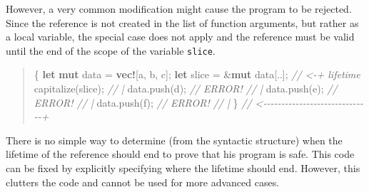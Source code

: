 \documentclass[
  11pt,
  twoside,symmetric]{report}
\newenvironment{Shaded}{}{}
\newcommand{\CharTok}[1]{#1}
\newcommand{\CommentTok}[1]{\textit{#1}}
\newcommand{\KeywordTok}[1]{\textbf{#1}}
\newcommand{\NormalTok}[1]{#1}
\newcommand{\OperatorTok}[1]{#1}
\newcommand{\PreprocessorTok}[1]{\textbf{#1}}
\begin{document}
However, a very common modification might cause the program to be
rejected. Since the reference is not created in the list of function
arguments, but rather as a local variable, the special case does not
apply and the reference must be valid until the end of the scope of the
variable \texttt{slice}.

\begin{quote}
\begin{Shaded}
\begin{Highlighting}[]
\OperatorTok{\{}
    \KeywordTok{let} \KeywordTok{mut}\NormalTok{ data }\OperatorTok{=} \PreprocessorTok{vec!}\NormalTok{[}\CharTok{\textquotesingle{}a\textquotesingle{}}\OperatorTok{,} \CharTok{\textquotesingle{}b\textquotesingle{}}\OperatorTok{,} \CharTok{\textquotesingle{}c\textquotesingle{}}\NormalTok{]}\OperatorTok{;}
    \KeywordTok{let}\NormalTok{ slice }\OperatorTok{=} \OperatorTok{\&}\KeywordTok{mut}\NormalTok{ data[}\OperatorTok{..}\NormalTok{]}\OperatorTok{;} \CommentTok{// \textless{}{-}+ \textquotesingle{}lifetime}
\NormalTok{    capitalize(slice)}\OperatorTok{;}         \CommentTok{//   |}
\NormalTok{    data}\OperatorTok{.}\NormalTok{push(}\CharTok{\textquotesingle{}d\textquotesingle{}}\NormalTok{)}\OperatorTok{;} \CommentTok{// ERROR!  //   |}
\NormalTok{    data}\OperatorTok{.}\NormalTok{push(}\CharTok{\textquotesingle{}e\textquotesingle{}}\NormalTok{)}\OperatorTok{;} \CommentTok{// ERROR!  //   |}
\NormalTok{    data}\OperatorTok{.}\NormalTok{push(}\CharTok{\textquotesingle{}f\textquotesingle{}}\NormalTok{)}\OperatorTok{;} \CommentTok{// ERROR!  //   |}
\OperatorTok{\}} \CommentTok{// \textless{}{-}{-}{-}{-}{-}{-}{-}{-}{-}{-}{-}{-}{-}{-}{-}{-}{-}{-}{-}{-}{-}{-}{-}{-}{-}{-}{-}{-}{-}{-}+}
\end{Highlighting}
\end{Shaded}
\end{quote}

There is no simple way to determine (from the syntactic structure) when
the lifetime of the reference should end to prove that his program is
safe. This code can be fixed by explicitly specifying where the lifetime
should end. However, this clutters the code and cannot be used for more
advanced cases.
\end{document}
